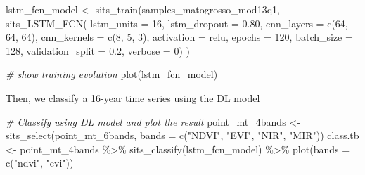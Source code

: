 \documentclass[a4paper,]{tufte-book}
\newenvironment{Shaded}{}{}
\newcommand{\AttributeTok}[1]{\textcolor[rgb]{0.49,0.56,0.16}{#1}}
\newcommand{\CommentTok}[1]{\textcolor[rgb]{0.38,0.63,0.69}{\textit{#1}}}
\newcommand{\DecValTok}[1]{\textcolor[rgb]{0.25,0.63,0.44}{#1}}
\newcommand{\FloatTok}[1]{\textcolor[rgb]{0.25,0.63,0.44}{#1}}
\newcommand{\FunctionTok}[1]{\textcolor[rgb]{0.02,0.16,0.49}{#1}}
\newcommand{\NormalTok}[1]{#1}
\newcommand{\OtherTok}[1]{\textcolor[rgb]{0.00,0.44,0.13}{#1}}
\newcommand{\SpecialCharTok}[1]{\textcolor[rgb]{0.25,0.44,0.63}{#1}}
\newcommand{\StringTok}[1]{\textcolor[rgb]{0.25,0.44,0.63}{#1}}
\begin{document}
\begin{Shaded}
\begin{Highlighting}[]
\NormalTok{lstm\_fcn\_model }\OtherTok{\textless{}{-}} \FunctionTok{sits\_train}\NormalTok{(samples\_matogrosso\_mod13q1, }
                       \FunctionTok{sits\_LSTM\_FCN}\NormalTok{(}
                          \AttributeTok{lstm\_units          =} \DecValTok{16}\NormalTok{,}
                          \AttributeTok{lstm\_dropout        =} \FloatTok{0.80}\NormalTok{,}
                          \AttributeTok{cnn\_layers          =} \FunctionTok{c}\NormalTok{(}\DecValTok{64}\NormalTok{, }\DecValTok{64}\NormalTok{, }\DecValTok{64}\NormalTok{),}
                          \AttributeTok{cnn\_kernels         =} \FunctionTok{c}\NormalTok{(}\DecValTok{8}\NormalTok{, }\DecValTok{5}\NormalTok{, }\DecValTok{3}\NormalTok{),}
                          \AttributeTok{activation          =} \StringTok{\textquotesingle{}relu\textquotesingle{}}\NormalTok{,}
                          \AttributeTok{epochs              =} \DecValTok{120}\NormalTok{,}
                          \AttributeTok{batch\_size          =} \DecValTok{128}\NormalTok{,}
                          \AttributeTok{validation\_split    =} \FloatTok{0.2}\NormalTok{,}
                          \AttributeTok{verbose             =} \DecValTok{0}\NormalTok{) )}

\CommentTok{\# show training evolution}
\FunctionTok{plot}\NormalTok{(lstm\_fcn\_model)}
\end{Highlighting}
\end{Shaded}

Then, we classify a 16-year time series using the DL model

\begin{Shaded}
\begin{Highlighting}[]
\CommentTok{\# Classify using DL model and plot the result}
\NormalTok{point\_mt\_4bands }\OtherTok{\textless{}{-}} \FunctionTok{sits\_select}\NormalTok{(point\_mt\_6bands, }
                               \AttributeTok{bands =} \FunctionTok{c}\NormalTok{(}\StringTok{"NDVI"}\NormalTok{, }\StringTok{"EVI"}\NormalTok{, }\StringTok{"NIR"}\NormalTok{, }\StringTok{"MIR"}\NormalTok{))}
\NormalTok{class.tb }\OtherTok{\textless{}{-}}\NormalTok{ point\_mt\_4bands }\SpecialCharTok{\%\textgreater{}\%} 
    \FunctionTok{sits\_classify}\NormalTok{(lstm\_fcn\_model) }\SpecialCharTok{\%\textgreater{}\%} 
    \FunctionTok{plot}\NormalTok{(}\AttributeTok{bands =} \FunctionTok{c}\NormalTok{(}\StringTok{"ndvi"}\NormalTok{, }\StringTok{"evi"}\NormalTok{))}
\end{Highlighting}
\end{Shaded}
\end{document}
